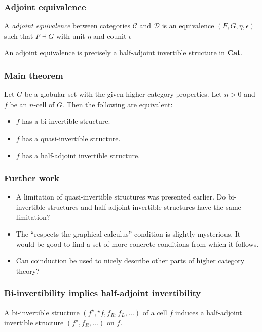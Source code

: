 \documentclass[presentation]{beamer}
\newcommand{\linv}[1]{{}^\star\!#1}
\newcommand{\rinv}[1]{#1^\star}
\begin{document}
\begin{frame}
  \frametitle{Adjoint equivalence}
  \begin{definition}
    A \emph{adjoint equivalence} between categories \(\mathcal C\) and \(\mathcal D\) is an equivalence \((F,G,\eta,\epsilon)\) such that \(F \dashv G\) with unit \(\eta\) and counit \(\epsilon\)
  \end{definition}

  \pause{}
  An adjoint equivalence is precisely a half-adjoint invertible structure in \textbf{Cat}.
\end{frame}

\begin{frame}
  \frametitle{Main theorem}

  \begin{theorem}
  Let \(G\) be a globular set with the given higher category properties. Let \(n > 0\) and \(f\) be an \(n\)-cell of \(G\). Then the following are equivalent:
  \begin{itemize}
  \item \(f\) has a bi-invertible structure.
  \item \(f\) has a quasi-invertible structure.
  \item \(f\) has a half-adjoint invertible structure.
  \end{itemize}
\end{theorem}
\end{frame}

\begin{frame}
  \frametitle{Further work}
  \begin{itemize}
  \item A limitation of quasi-invertible structures was presented earlier. Do bi-invertible structures and half-adjoint invertible structures have the same limitation?
  \item The ``respects the graphical calculus'' condition is slightly mysterious. It would be good to find a set of more concrete conditions from which it follows.
  \item Can coinduction be used to nicely describe other parts of higher category theory?
  \end{itemize}
\end{frame}

\begin{frame}
  \frametitle{Bi-invertibility implies half-adjoint invertibility}
  \begin{theorem}
  A bi-invertible structure \((\rinv f, \linv f, f_R, f_L, \dots)\) of a cell \(f\) induces a half-adjoint invertible structure \((\rinv f, f_R, \dots)\) on \(f\).
\end{theorem}
\end{frame}
\end{document}

